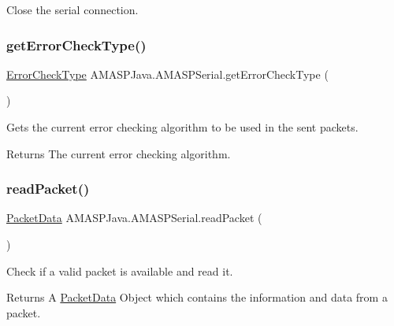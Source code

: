 Close the serial connection. \mbox{\label{class_a_m_a_s_p_java_1_1_a_m_a_s_p_serial_abe2bbc035a6337e7b04ea9e6a0498ced}} 
\subsubsection{\texorpdfstring{get\+Error\+Check\+Type()}{getErrorCheckType()}}
{\footnotesize\ttfamily \hyperlink{enum_a_m_a_s_p_java_1_1_a_m_a_s_p_serial_1_1_error_check_type}{Error\+Check\+Type} A\+M\+A\+S\+P\+Java.\+A\+M\+A\+S\+P\+Serial.\+get\+Error\+Check\+Type (\begin{DoxyParamCaption}{ }\end{DoxyParamCaption})}

Gets the current error checking algorithm to be used in the sent packets.

\begin{DoxyReturn}{Returns}
The current error checking algorithm. 
\end{DoxyReturn}
\mbox{\label{class_a_m_a_s_p_java_1_1_a_m_a_s_p_serial_a0770b15ce35cf5a58ae6f1949c1588c9}} 
\subsubsection{\texorpdfstring{read\+Packet()}{readPacket()}}
{\footnotesize\ttfamily \hyperlink{class_a_m_a_s_p_java_1_1_a_m_a_s_p_serial_1_1_packet_data}{Packet\+Data} A\+M\+A\+S\+P\+Java.\+A\+M\+A\+S\+P\+Serial.\+read\+Packet (\begin{DoxyParamCaption}{ }\end{DoxyParamCaption})}

Check if a valid packet is available and read it.

\begin{DoxyReturn}{Returns}
A \hyperlink{class_a_m_a_s_p_java_1_1_a_m_a_s_p_serial_1_1_packet_data}{Packet\+Data} Object which contains the information and data from a packet. 
\end{DoxyReturn}
\mbox{\label{class_a_m_a_s_p_java_1_1_a_m_a_s_p_serial_a33ea416e78a67d007dbe2ab9326205e6}} 
